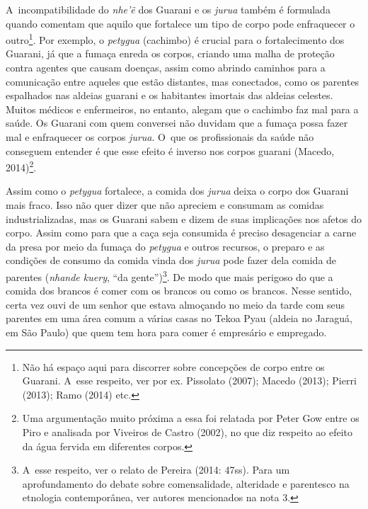 A~incompatibilidade do \emph{nhe’ẽ} dos Guarani e os \emph{jurua} também é
formulada quando comentam que aquilo que fortalece um tipo de corpo
pode enfraquecer o outro\footnote{Não há espaço aqui para discorrer
sobre concepções de corpo entre os Guarani. A~esse respeito, ver por
ex. Pissolato (2007); Macedo (2013); Pierri (2013); Ramo (2014) etc.}.
Por exemplo, o \emph{petygua} (cachimbo) é crucial para o fortalecimento
dos Guarani, já que a fumaça enreda os corpos, criando uma malha de
proteção contra agentes que causam doenças, assim como abrindo caminhos
para a comunicação entre aqueles que estão distantes, mas conectados,
como os parentes espalhados nas aldeias guarani e os habitantes
imortais das aldeias celestes. Muitos médicos e enfermeiros, no
entanto, alegam que o cachimbo faz mal para a saúde. Os Guarani com
quem conversei não duvidam que a fumaça possa fazer mal e enfraquecer
os corpos \emph{jurua}. O~que os profissionais da saúde não conseguem entender
é que esse efeito é inverso nos corpos guarani (Macedo,
2014)\footnote{Uma argumentação muito próxima a essa foi relatada por
Peter Gow entre os Piro e analisada por Viveiros de Castro (2002), no
que diz respeito ao efeito da água fervida em diferentes corpos.}. 


Assim como o \emph{petygua} fortalece, a comida dos \emph{jurua} deixa o corpo dos
Guarani mais fraco. Isso não quer dizer que não apreciem e consumam as
comidas industrializadas, mas os Guarani sabem e dizem de suas
implicações nos afetos do corpo. Assim como para que a caça seja
consumida é preciso desagenciar a carne da presa por meio da fumaça do
\emph{petygua} e outros recursos, o preparo e as condições de consumo da
comida vinda dos \emph{jurua} pode fazer dela comida de parentes (\emph{nhande
kuery}, ``da gente'')\footnote{A~esse respeito, ver o relato de Pereira
(2014: 47ss). Para um aprofundamento do debate sobre comensalidade,
alteridade e parentesco na etnologia contemporânea, ver autores
mencionados na nota 3.}. De modo que mais perigoso do que a comida dos
brancos é comer com os brancos ou como os brancos. Nesse sentido, certa
vez ouvi de um senhor que estava almoçando no meio da tarde com seus
parentes em uma área comum a várias casas no Tekoa Pyau (aldeia no
Jaraguá, em São Paulo) que quem tem hora para comer é empresário e
empregado.

